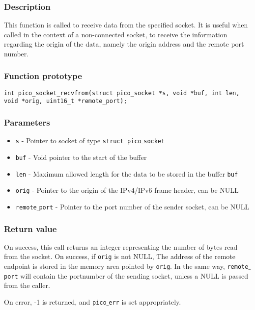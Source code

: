 \subsubsection*{Description}
This function is called to receive data from the specified socket.
It is useful when called in the context of a non-connected socket, to receive
the information regarding the origin of the data, namely the origin address and 
the remote port number.

\subsubsection*{Function prototype}
\begin{verbatim}
int pico_socket_recvfrom(struct pico_socket *s, void *buf, int len,
void *orig, uint16_t *remote_port);
\end{verbatim}

\subsubsection*{Parameters}
\begin{itemize}[noitemsep]
\item \texttt{s} - Pointer to socket of type \texttt{struct pico$\_$socket}
\item \texttt{buf} - Void pointer to the start of the buffer
\item \texttt{len} - Maximum allowed length for the data to be stored in the buffer \texttt{buf}
\item \texttt{orig} - Pointer to the origin of the IPv4/IPv6 frame header, can be NULL
\item \texttt{remote$\_$port} - Pointer to the port number of the sender socket, can be NULL
\end{itemize}

\subsubsection*{Return value}
On success, this call returns an integer representing the number of bytes read from the socket. On success, if \texttt{orig}
is not NULL, The address of the remote endpoint is stored in the memory area pointed by \texttt{orig}. 
In the same way, \texttt{remote$\_$port} will contain the portnumber of the sending socket, unless a NULL is passed
from the caller.

On error, -1 is returned, and \texttt{pico$\_$err} is set appropriately.

